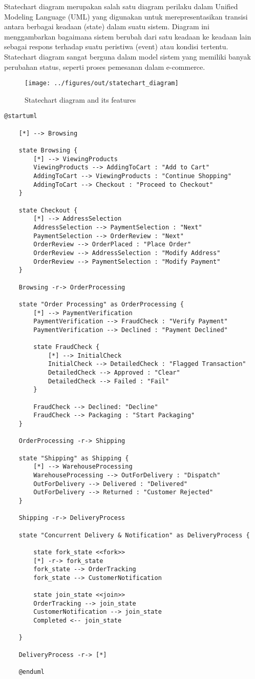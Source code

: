 Statechart diagram merupakan salah satu diagram perilaku dalam Unified Modeling Language (UML) yang digunakan untuk merepresentasikan transisi antara berbagai keadaan (state) dalam suatu sistem. Diagram ini menggambarkan bagaimana sistem berubah dari satu keadaan ke keadaan lain sebagai respons terhadap suatu peristiwa (event) atau kondisi tertentu. Statechart diagram sangat berguna dalam model sistem yang memiliki banyak perubahan status, seperti proses pemesanan dalam e-commerce.

\begin{figure}[ht]
	\centering
	\texttt{[image: ../figures/out/statechart\_diagram]}
	\caption{Statechart diagram and its features}
	\label{fig:statechart_diagram}
\end{figure}

\begin{lstlisting}[language=puml, caption={Statechart Diagram for E-Commerce Order Processing}]
	@startuml
	
	[*] --> Browsing
	
	state Browsing {
		[*] --> ViewingProducts
		ViewingProducts --> AddingToCart : "Add to Cart"
		AddingToCart --> ViewingProducts : "Continue Shopping"
		AddingToCart --> Checkout : "Proceed to Checkout"
	}
	
	state Checkout {
		[*] --> AddressSelection
		AddressSelection --> PaymentSelection : "Next"
		PaymentSelection --> OrderReview : "Next"
		OrderReview --> OrderPlaced : "Place Order"
		OrderReview --> AddressSelection : "Modify Address"
		OrderReview --> PaymentSelection : "Modify Payment"
	}
	
	Browsing -r-> OrderProcessing
	
	state "Order Processing" as OrderProcessing {
		[*] --> PaymentVerification
		PaymentVerification --> FraudCheck : "Verify Payment"
		PaymentVerification --> Declined : "Payment Declined"
		
		state FraudCheck {
			[*] --> InitialCheck
			InitialCheck --> DetailedCheck : "Flagged Transaction"
			DetailedCheck --> Approved : "Clear"
			DetailedCheck --> Failed : "Fail"
		}
		
		FraudCheck --> Declined: "Decline"
		FraudCheck --> Packaging : "Start Packaging"
	}
	
	OrderProcessing -r-> Shipping
	
	state "Shipping" as Shipping {
		[*] --> WarehouseProcessing
		WarehouseProcessing --> OutForDelivery : "Dispatch"
		OutForDelivery --> Delivered : "Delivered"
		OutForDelivery --> Returned : "Customer Rejected"
	}
	
	Shipping -r-> DeliveryProcess
	
	state "Concurrent Delivery & Notification" as DeliveryProcess {
		
		state fork_state <<fork>>
		[*] -r-> fork_state 
		fork_state --> OrderTracking
		fork_state --> CustomerNotification
		
		state join_state <<join>>
		OrderTracking --> join_state
		CustomerNotification --> join_state
		Completed <-- join_state
		
	}
	
	DeliveryProcess -r-> [*]
	
	@enduml
\end{lstlisting}
